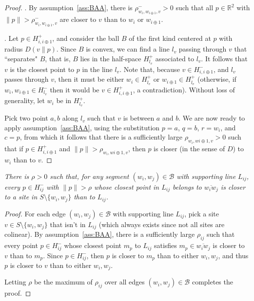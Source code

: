 \documentclass[11pt]{article}
\newcommand{\Sites}{S}
\newcommand{\D}[2]{D\left(#1 \parallel #2\right)}
\begin{document}
\begin{proof}
\vspace*{0.1in}.
By assumption~\ref{ass:BAA}, there is $ \rho^{-}_{w_i,w_{i\oplus 1},v} > 0$ 
	such that all $p\in\mathbb{R}^2$ with $\|p\| > \rho^{-}_{w_i,w_{i\oplus 1},v}$ 
	are closer to $v$ than to $w_i$ or $w_{i\oplus 1}$.


\vspace*{0.1in}.
Let $p\in H^{+}_{i,{i\oplus 1}}$, and consider the ball $B$ of the first kind centered at $p$ with radius $\D{v}{p}$. 
Since $B$ is convex, we can find a line $l_v$ passing through $v$ that ``separates" $B$, 
	that is, $B$ lies in the half-space $H^{+}_{l_v}$ associated to $l_v$. 
It follows that $v$ is the closest point to $p$ in the line $l_v$. 
Note that, because $v\in H^{-}_{i,{i\oplus 1}}$, and $l_v$ passes through $v$, 
	then it must be either $w_i \in H^{+}_{l_v}$ or $w_{i\oplus 1} \in H^{+}_{l_v}$ 
	(otherwise, if $w_i,w_{i\oplus 1}\in H^{-}_{l_v}$ then it would be $v\in H^{+}_{i,{i\oplus 1}}$, a contradiction). 
Without loss of generality, let $w_i$ be in $H^{+}_{l_v}$. 

Pick two point $a,b$ along $l_v$ such that $v$ is between $a$ and $b$. 
We are now ready to apply assumption~\ref{ass:BAA}, using the substitution
	$p=a$, $q=b$, $r=w_i$, and $c=p$, 
	from which it follows that there is a sufficiently large $\rho_{w_i,w{i\oplus 1},v} > 0$ 
		such that if $p\in H^{+}_{i,{i\oplus 1}}$ and $\|p\| > \rho_{w_i,w{i\oplus 1},v}$, 
		then $p$ is closer (in the sense of $D$) to $w_i$ than to $v$. 



\end{proof}





\emph{
There is $\rho > 0$ such that, for any segment $(w_i,w_j)\in\mathcal{B}$ with supporting line $L_{ij}$, 
	 every $p\in H^{-}_{ij}$ with $\|p\| > \rho$ whose closest point in $L_{ij}$ belongs to $\overline{w_i w_j}$ is 
	closer to a site in $\Sites\setminus\{w_i,w_j\}$ than to $L_{ij}$. }
\begin{proof}
For each edge $(w_i,w_j)\in\mathcal{B}$ with supporting line $L_{ij}$, 
	pick a site $v\in\Sites\setminus\{w_i,w_j\}$ that isn't in $L_{ij}$ (which always exists since not all sites are colinear). 
By assumption~\ref{ass:BAA}, there is a sufficiently large $\rho_{ij}$ such that every point $p\in H^{-}_{ij}$ 
	whose closest point $m_p$ to $L_{ij}$ satisfies $m_p\in\overline{w_i w_j}$ is closer to $v$ than to $m_p$. 
Since $p\in H^{-}_{ij}$, then $p$ is closer to $m_p$ than to either $w_i,w_j$, and 
thus $p$ is closer to $v$ than to either $w_i,w_j$. 

Letting $\rho$ be the maximum of $\rho_{ij}$ over all edges  $(w_i,w_j)\in\mathcal{B}$ completes the proof. 
\end{proof}
\end{document}
